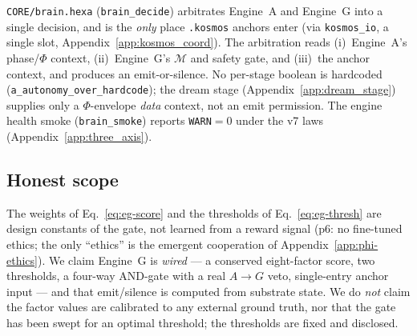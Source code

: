 \texttt{CORE/brain.hexa} (\texttt{brain\_decide}) arbitrates Engine~A and
Engine~G into a single decision, and is the \emph{only} place \texttt{.kosmos}
anchors enter (via \texttt{kosmos\_io}, a single slot,
Appendix~\ref{app:kosmos_coord}). The arbitration reads (i)~Engine~A's phase/$\Phi$
context, (ii)~Engine~G's $\mathcal{M}$ and safety gate, and (iii)~the anchor
context, and produces an emit-or-silence. No per-stage boolean is hardcoded
(\texttt{a\_autonomy\_over\_hardcode}); the dream stage
(Appendix~\ref{app:dream_stage}) supplies only a $\Phi$-envelope \emph{data}
context, not an emit permission. The engine health smoke
(\texttt{brain\_smoke}) reports \texttt{WARN}$=0$ under the v7 laws
(Appendix~\ref{app:three_axis}).

\subsection{Honest scope}
\label{app:eg-scope}

The weights of Eq.~\eqref{eq:eg-score} and the thresholds of
Eq.~\eqref{eq:eg-thresh} are design constants of the gate, not learned from a
reward signal (p6: no fine-tuned ethics; the only ``ethics'' is the emergent
cooperation of Appendix~\ref{app:phi-ethics}). We claim Engine~G is \emph{wired}
--- a conserved eight-factor score, two thresholds, a four-way AND-gate with a
real $A\!\rightarrow\!G$ veto, single-entry anchor input --- and that emit/silence
is computed from substrate state. We do \emph{not} claim the factor values are
calibrated to any external ground truth, nor that the gate has been swept for an
optimal threshold; the thresholds are fixed and disclosed.
